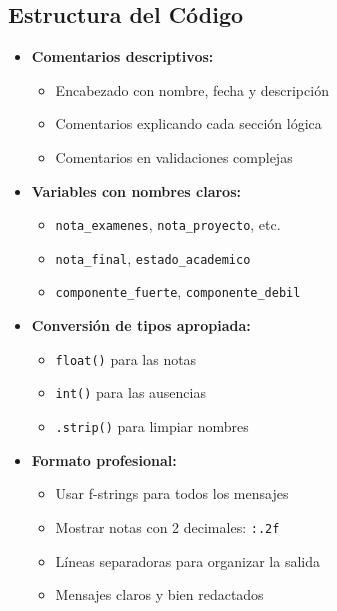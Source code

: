 \documentclass[12pt,a4paper]{article}
\begin{document}
\subsection{Estructura del Código}

\begin{itemize}[leftmargin=*]
    \item \textbf{Comentarios descriptivos:}
    \begin{itemize}
        \item Encabezado con nombre, fecha y descripción
        \item Comentarios explicando cada sección lógica
        \item Comentarios en validaciones complejas
    \end{itemize}
    
    \item \textbf{Variables con nombres claros:}
    \begin{itemize}
        \item \texttt{nota\_examenes}, \texttt{nota\_proyecto}, etc.
        \item \texttt{nota\_final}, \texttt{estado\_academico}
        \item \texttt{componente\_fuerte}, \texttt{componente\_debil}
    \end{itemize}
    
    \item \textbf{Conversión de tipos apropiada:}
    \begin{itemize}
        \item \texttt{float()} para las notas
        \item \texttt{int()} para las ausencias
        \item \texttt{.strip()} para limpiar nombres
    \end{itemize}
    
    \item \textbf{Formato profesional:}
    \begin{itemize}
        \item Usar f-strings para todos los mensajes
        \item Mostrar notas con 2 decimales: \texttt{:.2f}
        \item Líneas separadoras para organizar la salida
        \item Mensajes claros y bien redactados
    \end{itemize}
\end{itemize}
\end{document}
